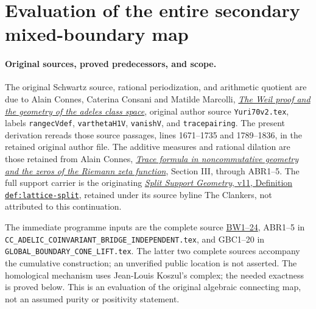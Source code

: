 \section{Evaluation of the entire secondary mixed-boundary map}
\label{sec:global-secondary-boundary-evaluation}

\paragraph{Original sources, proved predecessors, and scope.}
The original Schwartz source, rational periodization, and arithmetic
quotient are due to Alain Connes, Caterina Consani and Matilde Marcolli,
\href{https://arxiv.org/abs/math/0703392v1}{\emph{The Weil proof and
the geometry of the adeles class space}}, original author source
\nolinkurl{Yuri70v2.tex}, labels \texttt{rangecVdef},
\texttt{varthetaH1V}, \texttt{vanishV}, and \texttt{tracepairing}.
The present derivation rereads those source passages, lines 1671--1735
and 1789--1836, in the retained original author file. The additive
measures and rational dilation are those retained from Alain Connes,
\href{https://arxiv.org/abs/math/9811068v1}{\emph{Trace formula in
noncommutative geometry and the zeros of the Riemann zeta function}},
Section III, through ABR1--5. The full support carrier is the originating
\href{https://github.com/KokunoYumeto/zeta-function-research-reader/blob/a2851f9eb352e7e4376bc629de86fa4ed9c1c434/workbenches/splitzero-tandem/foundations/split-support-geometry-v11/split_support_geometry_arithmetic_curve_v11.tex}{\emph{Split Support Geometry}, v11,
Definition \texttt{def:lattice-split}}, retained under its source
byline The Clankers, not attributed to this continuation.

The immediate programme inputs are the complete source
\href{https://github.com/KokunoYumeto/zeta-function-research-reader/blob/e1dc06aa68bb810cf7d8b0006942f5b036b8b765/workbenches/splitzero-tandem/continuations/20260923-retained-source-readers/all-prime-boundary-weights/ROOT_BOUNDARY_WEIGHT_HOMOLOGY.tex}{BW1--24},
ABR1--5 in \nolinkurl{CC_ADELIC_COINVARIANT_BRIDGE_INDEPENDENT.tex},
and GBC1--20 in \nolinkurl{GLOBAL_BOUNDARY_CONE_LIFT.tex}.
The latter two complete sources accompany the cumulative construction;
an unverified public location is not asserted. The homological
mechanism uses Jean-Louis Koszul's complex; the needed exactness is
proved below. This is an evaluation of the original algebraic
connecting map, not an assumed purity or positivity statement.

